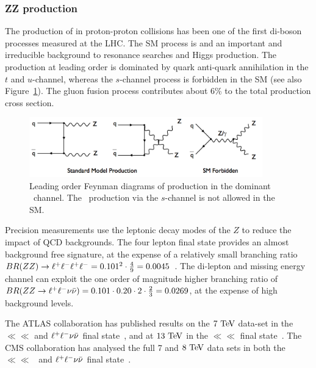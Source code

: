 \subsubsection{ZZ production}
\label{sss-ZZprod}

The production of \ZZ in proton-proton collisions has been one of the first di-boson 
processes measured at the LHC. The SM process is and an important and irreducible
background to resonance searches and Higgs production. The production at leading
order is dominated by quark anti-quark annihilation in the $t$ and $u$-channel,
whereas the $s$-channel process is forbidden in the SM 
(see also Figure~\ref{fig:sss-ZZprod-LOdiagrams}). The gluon fusion process 
contributes about 6\% to the total production cross section. 

\begin{figure}[htbp]
  \begin{center}
  \includegraphics[width=0.9\textwidth]{figures/sss-inclboson-diboson-zzprod-zzdiagram.png}
  \caption{Leading order Feynman diagrams of \ZZ production in the dominant 
  \qqbar\ channel. The \ZZ\ production via the $s$-channel is not allowed in the SM.}
\label{fig:sss-ZZprod-LOdiagrams}
\end{center}
\end{figure}

Precision measurements use the leptonic decay modes of the $Z$ to reduce the impact of
QCD backgrounds. 
The four lepton final state provides an almost background free signature, at the
expense of a relatively small branching ratio 
$BR(ZZ) \to \ll\ll = 0.101^2 \cdot {4 \over 9} = 0.0045$~\cite{PDG}.  
The di-lepton and missing energy channel can exploit the one order of magnitude
higher branching ratio of 
$BR(\ZZ \to \ll\vv) = 0.101 \cdot 0.20 \cdot 2 \cdot {2 \over 3} = 0.0269$, 
at the expense of high background levels.

The ATLAS collaboration has published results on the $7\TeV$ data-set 
in the $\ll\ll$ and $\ll\vv$ final state~\cite{Aad:2012awa}, and at
$13\TeV$ in the $\ll\ll$ final state~\cite{Aad:2015zqe}. The CMS collaboration
has analysed the full 7 and $8\TeV$ data sets in both 
the $\ll\ll$~\cite{Chatrchyan:2012sga,Khachatryan:2014dia} and 
$\ll\vv$ final state~\cite{Khachatryan:2015pba}.

